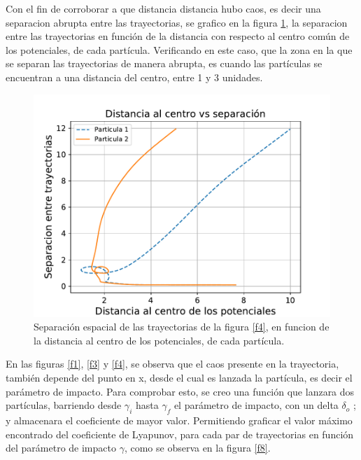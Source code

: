 \documentclass[11pt,letterpaper,twocolumn]{article}
\begin{document}
\par 
Con el fin de corroborar a que distancia distancia hubo caos, es decir una separacion abrupta entre las trayectorias, se grafico en la figura \ref{f7}, la separacion entre las trayectorias en función de la distancia con respecto al centro común de los potenciales, de cada partícula. Verificando en este caso, que la zona en la que se separan las trayectorias de manera abrupta, es cuando las partículas se encuentran a una distancia del centro, entre 1 y 3 unidades. 
\begin{figure}[H]
\centering 
\includegraphics[scale=0.55]{g8.pdf}
\caption{Separación espacial de las trayectorias de la figura \ref{f4}, en funcion de la distancia al centro de los potenciales, de cada partícula.}
\label{f7}
\end{figure}    
\par 
En las figuras \ref{f1}, \ref{f3} y \ref{f4}, se observa que el caos presente en la trayectoria, también depende  del punto en x, desde el cual es lanzada la partícula, es decir el parámetro de impacto. Para comprobar esto, se creo una función que lanzara dos partículas, barriendo desde $\gamma_{i}$ hasta $\gamma_{f}$ el parámetro de impacto, con un delta $\delta_{o}$ ; y almacenara el coeficiente de mayor valor. Permitiendo graficar el valor máximo encontrado del coeficiente de Lyapunov, para cada par de trayectorias en función del parámetro de impacto $\gamma$, como se observa en la figura \ref{f8}.
 
\end{document}
